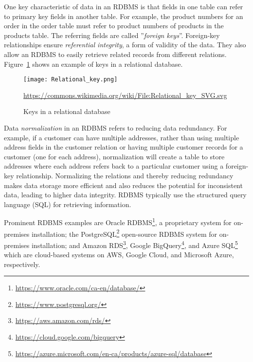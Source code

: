 One key characteristic of data in an RDBMS is that fields in one table can refer to primary key fields in another table. For example, the product numbers for an order in the order table must refer to product numbers of products in the products table. The referring fields are called ''\emph{foreign keys}''. Foreign-key relationships ensure \emph{referential integrity}, a form of validity of the data. They also allow an RDBMS to easily retrieve related records from different relations. Figure~\ref{fig:relationkeys} shows an example of keys in a relational database.

\begin{figure}
\centering
\texttt{[image: Relational\_key.png]}

\scriptsize{\url{https://commons.wikimedia.org/wiki/File:Relational_key_SVG.svg}}
\caption{Keys in a relational database}
\label{fig:relationkeys}
\end{figure}

Data \emph{normalization} in an RDBMS refers to reducing data redundancy. For example, if a customer can have multiple addresses, rather than using multiple address fields in the customer relation or having multiple customer records for a customer (one for each address), normalization will create a table to store addresses where each address refers back to a particular customer using a foreign-key relationship. Normalizing the relations and thereby reducing redundancy makes data storage more efficient and also reduces the potential for inconsistent data, leading to higher data integrity. RDBMS typically use the structured query language (SQL) for retrieving information. 

Prominent RDBMS examples are Oracle RDBMS\footnote{\url{https://www.oracle.com/ca-en/database/}}, a proprietary system for on-premises installation; the PostgreSQL\footnote{\url{https://www.postgresql.org/}} open-source RDBMS system for on-premises installation; and Amazon RDS\footnote{\url{https://aws.amazon.com/rds/}}, Google BigQuery\footnote{\url{https://cloud.google.com/bigquery}}, and Azure SQL\footnote{\url{https://azure.microsoft.com/en-ca/products/azure-sql/database}} which are cloud-based systems on AWS, Google Cloud, and Microsoft Azure, respectively.

